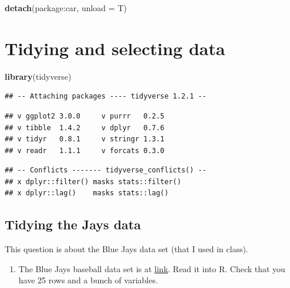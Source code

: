 \documentclass[]{tufte-book}
\newenvironment{Shaded}{}{}
\newcommand{\DataTypeTok}[1]{\textcolor[rgb]{0.56,0.13,0.00}{#1}}
\newcommand{\KeywordTok}[1]{\textcolor[rgb]{0.00,0.44,0.13}{\textbf{#1}}}
\newcommand{\NormalTok}[1]{#1}
\newcommand{\OperatorTok}[1]{\textcolor[rgb]{0.40,0.40,0.40}{#1}}
\providecommand{\tightlist}{%
  \setlength{\itemsep}{0pt}\setlength{\parskip}{0pt}}
\theoremstyle{definition}
\theoremstyle{definition}
\theoremstyle{definition}
\theoremstyle{remark}
\begin{document}
\begin{Shaded}
\begin{Highlighting}[]
\KeywordTok{detach}\NormalTok{(package}\OperatorTok{:}\NormalTok{car, }\DataTypeTok{unload =}\NormalTok{ T)}
\end{Highlighting}
\end{Shaded}

\hypertarget{tidying-and-selecting-data}{%
\chapter{Tidying and selecting data}\label{tidying-and-selecting-data}}

\begin{Shaded}
\begin{Highlighting}[]
\KeywordTok{library}\NormalTok{(tidyverse)}
\end{Highlighting}
\end{Shaded}

\begin{verbatim}
## -- Attaching packages ---- tidyverse 1.2.1 --
\end{verbatim}

\begin{verbatim}
## v ggplot2 3.0.0     v purrr   0.2.5
## v tibble  1.4.2     v dplyr   0.7.6
## v tidyr   0.8.1     v stringr 1.3.1
## v readr   1.1.1     v forcats 0.3.0
\end{verbatim}

\begin{verbatim}
## -- Conflicts ------- tidyverse_conflicts() --
## x dplyr::filter() masks stats::filter()
## x dplyr::lag()    masks stats::lag()
\end{verbatim}

\hypertarget{tidying-the-jays-data}{%
\section{Tidying the Jays data}\label{tidying-the-jays-data}}

This question is about the Blue Jays data set (that I used in class).

\begin{enumerate}
\def\labelenumi{(\alph{enumi})}
\tightlist
\item
  The Blue Jays baseball data set is at
  \href{http://www.utsc.utoronto.ca/~butler/c32/jays15-home.csv}{link}.
  Read it into R. Check that you have 25 rows and a bunch of variables.
\end{enumerate}
\end{document}
